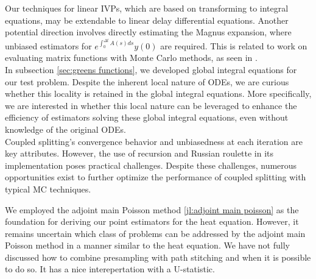 \documentclass[a4paper,12pt]{article}
\begin{document}
Our techniques for linear IVPs, which are based on transforming to integral equations, may be extendable 
to linear delay differential equations. Another potential direction involves directly estimating 
the Magnus expansion, where unbiased estimators for $e^{\int_{0}^{\Delta t} A(s)ds} y(0)$ are required. 
This is related to work on evaluating matrix functions with Monte Carlo methods, as seen in \cite{guidotti_fast_2023}. \\

In subsection \ref{sec:greens functions}, we developed global integral equations for our test problem. 
Despite the inherent local nature of ODEs, we are curious whether this locality is retained in the global integral equations. 
More specifically, we are interested in whether this local nature can be leveraged to enhance the efficiency of 
estimators solving these global integral equations, even without knowledge of the original ODEs.  \\

Coupled splitting's convergence behavior and unbiasedness at each iteration are key attributes. 
However, the use of recursion and Russian roulette in its implementation poses practical challenges. 
Despite these challenges, numerous opportunities exist to further optimize the performance of coupled splitting
with typical MC techniques.

We employed the adjoint main Poisson method \ref{jl:adjoint main poisson} as the foundation for deriving our 
point estimators for the heat equation. However, it remains uncertain which class of problems can be addressed 
by the adjoint main Poisson method in a manner similar to the heat equation. 
We have not fully discussed how to combine presampling with path stitching and when it is possible to do so.
It has a nice interepertation with a U-statistic. \\



\end{document}
